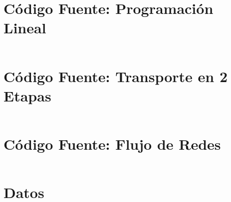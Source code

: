 \documentclass{article}
\begin{document}
  \begin{appendices}

    \section{Código Fuente: Programación Lineal}

      \inputminted{text}{./../mosel/linear-programming-model.mos}

    \section{Código Fuente: Transporte en 2 Etapas}

      \inputminted{text}{./../mosel/two-steps-transportation-model.mos}

    \section{Código Fuente: Flujo de Redes}

      \inputminted{text}{./../mosel/network-flow-model.mos}

    \section{Datos}

      \inputminted{text}{./../mosel/data.dat}

  \end{appendices}






  \nocite{subject:pent2017}
  \nocite{tool:xpress-mosel}
  \nocite{repository:network-flow-transeuro}

  
  
\end{document}
